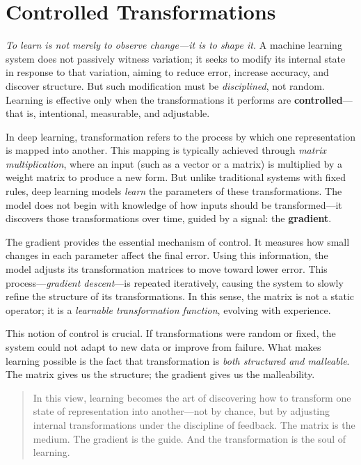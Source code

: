 \section{Controlled Transformations}

\textit{To learn is not merely to observe change—it is to shape it.}  
A machine learning system does not passively witness variation; it seeks to modify its internal state in response to that variation, aiming to reduce error, increase accuracy, and discover structure. But such modification must be \textit{disciplined}, not random. Learning is effective only when the transformations it performs are \textbf{controlled}—that is, intentional, measurable, and adjustable.

In deep learning, transformation refers to the process by which one representation is mapped into another. This mapping is typically achieved through \textit{matrix multiplication}, where an input (such as a vector or a matrix) is multiplied by a weight matrix to produce a new form. But unlike traditional systems with fixed rules, deep learning models \textit{learn} the parameters of these transformations. The model does not begin with knowledge of how inputs should be transformed—it discovers those transformations over time, guided by a signal: the \textbf{gradient}.

The gradient provides the essential mechanism of control. It measures how small changes in each parameter affect the final error. Using this information, the model adjusts its transformation matrices to move toward lower error. This process—\textit{gradient descent}—is repeated iteratively, causing the system to slowly refine the structure of its transformations. In this sense, the matrix is not a static operator; it is a \textit{learnable transformation function}, evolving with experience.

This notion of control is crucial. If transformations were random or fixed, the system could not adapt to new data or improve from failure. What makes learning possible is the fact that transformation is \textit{both structured and malleable}. The matrix gives us the structure; the gradient gives us the malleability.

\begin{quote}
	In this view, learning becomes the art of discovering how to transform one state of representation into another—not by chance, but by adjusting internal transformations under the discipline of feedback. The matrix is the medium. The gradient is the guide. And the transformation is the soul of learning.
\end{quote}

